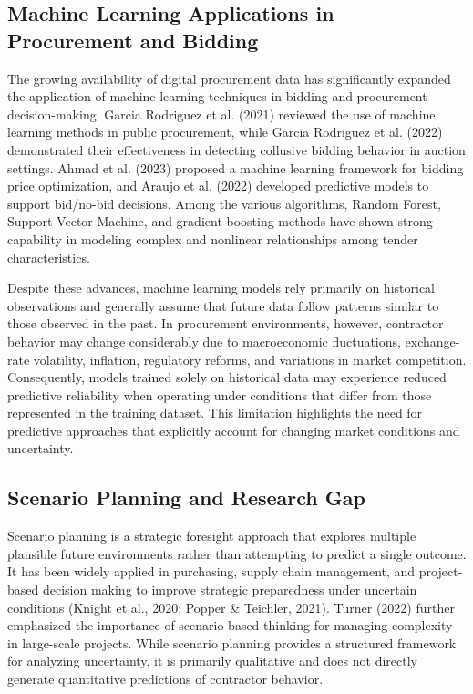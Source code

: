 \documentclass[twoside]{article}
\begin{document}
\subsection{Machine Learning Applications in Procurement and Bidding}

The growing availability of digital procurement data has significantly expanded the application of machine learning techniques in bidding and procurement decision-making. Garcia Rodriguez et al. (2021) reviewed the use of machine learning methods in public procurement, while Garcia Rodriguez et al. (2022) demonstrated their effectiveness in detecting collusive bidding behavior in auction settings. Ahmad et al. (2023) proposed a machine learning framework for bidding price optimization, and Araujo et al. (2022) developed predictive models to support bid/no-bid decisions. Among the various algorithms, Random Forest, Support Vector Machine, and gradient boosting methods have shown strong capability in modeling complex and nonlinear relationships among tender characteristics.

Despite these advances, machine learning models rely primarily on historical observations and generally assume that future data follow patterns similar to those observed in the past. In procurement environments, however, contractor behavior may change considerably due to macroeconomic fluctuations, exchange-rate volatility, inflation, regulatory reforms, and variations in market competition. Consequently, models trained solely on historical data may experience reduced predictive reliability when operating under conditions that differ from those represented in the training dataset. This limitation highlights the need for predictive approaches that explicitly account for changing market conditions and uncertainty.

\subsection{Scenario Planning and Research Gap}

Scenario planning is a strategic foresight approach that explores multiple plausible future environments rather than attempting to predict a single outcome. It has been widely applied in purchasing, supply chain management, and project-based decision making to improve strategic preparedness under uncertain conditions (Knight et al., 2020; Popper \& Teichler, 2021). Turner (2022) further emphasized the importance of scenario-based thinking for managing complexity in large-scale projects. While scenario planning provides a structured framework for analyzing uncertainty, it is primarily qualitative and does not directly generate quantitative predictions of contractor behavior.
\end{document}
